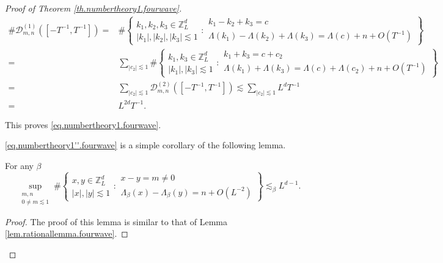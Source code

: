 \begin{proof}[Proof of Theorem \ref{th.numbertheory1.fourwave}]
\begin{equation}\label{eq.thrationalexpandlong.fourwave}
\begin{split}
\#\mathcal{D}^{(1)}_{m,n}([-T^{-1},T^{-1} ])=&\#\left\{\begin{matrix}
k_1,k_2,k_3\in\mathbb{Z}_L^d \\
|k_1|,|k_2|,|k_3|\lesssim 1
\end{matrix}
:
\begin{matrix}
k_1-k_2+k_3=c \\
\Lambda(k_1)-\Lambda(k_2)+\Lambda(k_3)=\Lambda(c)+n+O(T^{-1})
\end{matrix}
\right\}
\\
=&\sum_{|c_2|\lesssim 1} \#\left\{\begin{matrix}
k_1,k_3\in\mathbb{Z}_L^d \\
|k_1|,|k_3|\lesssim 1
\end{matrix}
:
\begin{matrix}
k_1+k_3=c+c_2 \\
\Lambda(k_1)+\Lambda(k_3)=\Lambda(c)+\Lambda(c_2)+n+O(T^{-1})
\end{matrix}
\right\}
\\
= &  \sum_{|c_2|\lesssim 1} \mathcal{D}^{(2)}_{m,n}([-T^{-1},T^{-1} ])\lesssim \sum_{|c_2|\lesssim 1} L^{d} T^{-1}
\\
=&L^{2d} T^{-1}.
\end{split}
\end{equation}

This proves \eqref{eq.numbertheory1.fourwave}.

\eqref{eq.numbertheory1''.fourwave} is a simple corollary of the following lemma. 

\begin{lem}\label{lem.rationallemma2.fourwave} For any $\beta$
\begin{equation}
    \sup_{\substack{m,n\\0\ne m\lesssim 1}} \#\left\{\begin{array}{cc}
         x,y\in\mathbb{Z}^d_L  \\
         |x|,|y|\lesssim 1
    \end{array}:\begin{array}{cc}
         x-y=m\ne 0  \\
         \Lambda_{\beta}(x)-\Lambda_{\beta}(y)=n+O(L^{-2})
    \end{array}\right\}\lesssim_{\beta} L^{d-1} .
\end{equation}
\end{lem}
\begin{proof} The proof of this lemma is similar to that of Lemma \ref{lem.rationallemma.fourwave}. 


\end{proof}
\end{proof}
